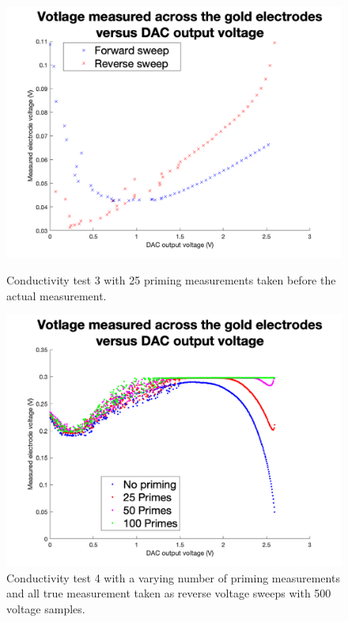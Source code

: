 \begin{figure}[ht]
    \begin{minipage}{0.5\textwidth}
        \centering
        \includegraphics[width=\textwidth]{Figures/Testing/Aus5}
        \caption{Conductivity test 3 with 25 priming measurements taken before the actual measurement.}
        \label{fig:test3} %
    \end{minipage}
    \begin{minipage}{0.5\textwidth}
        \centering
        \includegraphics[width=\textwidth]{Figures/Testing/Aus7}
        \caption{Conductivity test 4 with a varying number of priming measurements and all true measurement taken as reverse voltage sweeps with 500 voltage samples.}
        \label{fig:test4} %
    \end{minipage}
\end{figure}

